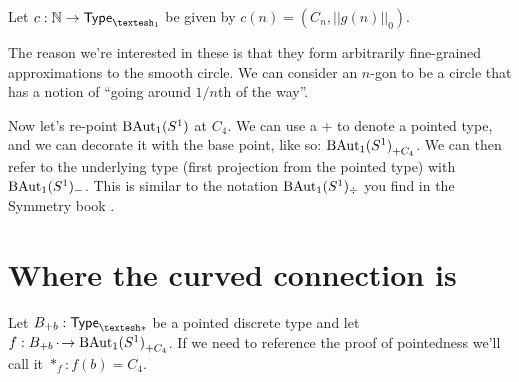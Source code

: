 \documentclass[12pt]{article}
\begin{document}
\begin{mydef}
Let \( c:\nn\to \Typeo \) be given by \( c(n)=(C_n, ||g(n)||_0)\).
\end{mydef}

The reason we're interested in these is that they form arbitrarily fine-grained approximations to the smooth circle. We can consider an \( n \)-gon to be a circle that has a notion of ``going around \( 1/n \)th of the way''.

Now let's re-point \( \mathrm{BAut}_1(S^1) \) at \( C_4 \). We can use a + to denote a pointed type, and we can decorate it with the base point, like so: \( {\mathrm{BAut}_1(S^1)}_{+{C_4}} \). We can then refer to the underlying type (first projection from the pointed type) with \( \mathrm{BAut}_1(S^1)_- \). This is similar to the notation \( \mathrm{BAut}_1(S^1)_{\div} \) you find in the Symmetry book \cite{Symmetry}.

\section{Where the curved connection is}

Let \( \Bpb:\Typesp \) be a pointed discrete type and let \( f:{B}_{+{b}}\,\cdot\!\to{\mathrm{BAut}_1(S^1)}_{+{C_4}} \). If we need to reference the proof of pointedness we'll call it \( *_f:f(b)=C_4 \). 


\end{document}
